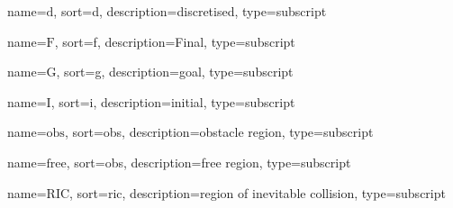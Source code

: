 	{%
		name={\ensuremath{\mathrm{d}}},
		sort=d,
		description=discretised,
		type=subscript
	}
	\newcommand{\discrete}{\gls{sub:discrete}}

	{%
		name={\ensuremath{\mathrm{F}}},
		sort=f,
		description=Final,
		type=subscript
	}
	\newcommand{\final}{\gls{sub:final}}

	{%
		name={\ensuremath{\mathrm{G}}},
		sort=g,
		description=goal,
		type=subscript
	}
	\newcommand{\goal}{\gls{sub:goal}}

	{%
		name={\ensuremath{\mathrm{I}}},
		sort=i,
		description=initial,
		type=subscript
	}
	\newcommand{\initial}{\gls{sub:initial}}

	{%
		name={\ensuremath{\mathrm{obs}}},
		sort=obs,
		description=obstacle region,
		type=subscript
	}
	\newcommand{\obstacleregion}{\gls{sub:obstacleregion}}

	{%
		name={\ensuremath{\mathrm{free}}},
		sort=obs,
		description=free region,
		type=subscript
	}
	\newcommand{\freeregion}{\gls{sub:freeregion}}

	{%
		name={\ensuremath{\mathrm{RIC}}},
		sort=ric,
		description=region of inevitable collision,
		type=subscript
	}
	\newcommand{\regionOfInevitableCollision}{\gls{sub:regionOfInevitableCollision}}

